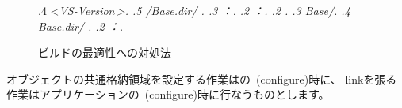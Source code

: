 \begin{narrow}[20pt]
\begin{figure}[h]
\begin{narrow}[40pt]
\begin{minipage}{\textwidth}
{{{			.4 \textless \it{VS-Version\,}\textgreater .
			.5 /Base.dir/ .
			.3 \KLUDGE ：.
			.2 \KLUDGE ：.
			.2 \build {}.
			.3 Base/.
			.4 Base.dir/ .
			.2 \KLUDGE ：.
		}}}
		\medskip
    	\end{minipage}\end{narrow}
    	\begin{narrow}[40pt]\begin{minipage}{\textwidth}
		{\footnotesize{}}
		\medskip
  	\end{minipage}\end{narrow}
	\caption{\KLUDGE ビルドの最適性への対処法}
	\label{fig:ApproachToBuildOptimization}
	\end{figure}
\fi
	\indent
	\KLUDGE オブジェクトの共通格納領域を設定する作業は\SprLib \KLUDGE の\cmake\ (configure)\KLUDGE 時に、
	link\KLUDGE を張る作業はアプリケーションの\cmake\ (configure)\KLUDGE 時に行なうものとします。
\end{narrow}

